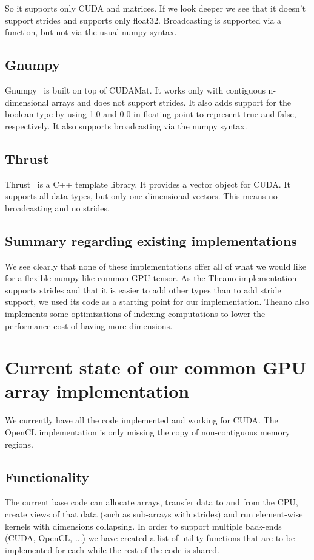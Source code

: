 \documentclass{article} %
\begin{document}
So it supports only CUDA and matrices. 
If we look deeper we see that it doesn't support strides and supports only float32. 
Broadcasting is supported via a function, but not via the usual numpy syntax.

\subsection{Gnumpy}
Gnumpy~\citep{gnumpy-TR2010} is built on top of CUDAMat.
It works only with contiguous n-dimensional arrays and does not support strides.
It also adds support for the boolean type by using 1.0 and 0.0 in floating point to represent true and false, respectively. 
It also supports broadcasting via the numpy syntax.

\subsection{Thrust}
Thrust~\citep{Thrust} is a C++ template library.
It provides a vector object for CUDA.
It supports all data types, but only one dimensional vectors.
This means no broadcasting and no strides.

\subsection{Summary regarding existing implementations}
We see clearly that none of these implementations offer all of what we would like for a flexible numpy-like common GPU tensor.
As the Theano implementation supports strides and that it is easier to add other types than to add stride support, we used its code as a starting point for our implementation.
Theano also implements some optimizations of indexing computations to lower the performance cost of having more dimensions.

\section{Current state of our common GPU array implementation}
\label{sec:currentimpl}
We currently have all the code implemented and working for CUDA.
The OpenCL implementation is only missing the copy of non-contiguous memory regions.

\subsection{Functionality}

The current base code can allocate arrays, transfer data to and from the CPU, create views of that data (such as sub-arrays with strides) and run element-wise kernels with dimensions collapsing.
In order to support multiple back-ends (CUDA, OpenCL, ...) we have created a list of utility functions that are to be implemented for each 
while the rest of the code is shared.
\end{document}
